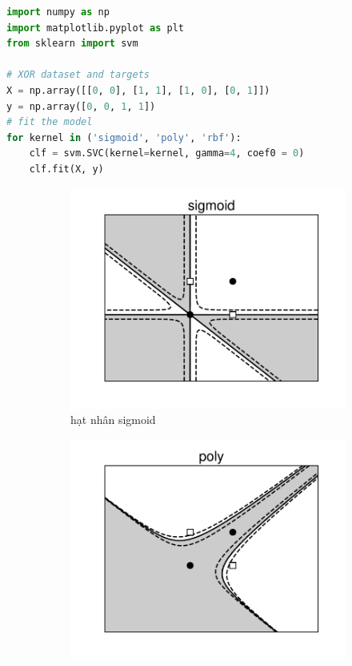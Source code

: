 \begin{lstlisting}[language=Python]
import numpy as np
import matplotlib.pyplot as plt
from sklearn import svm

# XOR dataset and targets
X = np.array([[0, 0], [1, 1], [1, 0], [0, 1]])
y = np.array([0, 0, 1, 1])
# fit the model
for kernel in ('sigmoid', 'poly', 'rbf'):
    clf = svm.SVC(kernel=kernel, gamma=4, coef0 = 0)
    clf.fit(X, y)
\end{lstlisting}
% 
 
\begin{figure}[t]
    \begin{subfigure}{0.325\textwidth}
    \includegraphics[width=\linewidth]{Chapters/09_SupportVectorMachines/21_kernelsvm/plt/sigmoid1.pdf}
    \caption{hạt nhân sigmoid}
    \end{subfigure}
    \begin{subfigure}{0.325\textwidth}
    \includegraphics[width=\linewidth]{Chapters/09_SupportVectorMachines/21_kernelsvm/plt/poly1.pdf}

\end{subfigure}
\end{figure}
